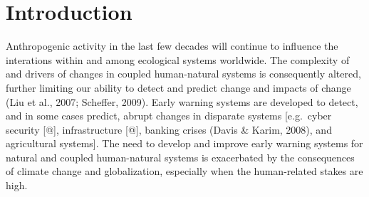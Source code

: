 \documentclass[12pt,twoside,openany]{reedthesis}
\begin{document}
\chapter{Introduction}\label{intro-chapter}

Anthropogenic activity in the last few decades will continue to
influence the interations within and among ecological systems worldwide.
The complexity of and drivers of changes in coupled human-natural
systems is consequently altered, further limiting our ability to detect
and predict change and impacts of change (Liu et al., 2007; Scheffer,
2009). Early warning systems are developed to detect, and in some cases
predict, abrupt changes in disparate systems {[}e.g.~cyber security
{[}@{]}, infrastructure {[}@{]}, banking crises (Davis \& Karim, 2008),
and agricultural systems{]}. The need to develop and improve early
warning systems for natural and coupled human-natural systems is
exacerbated by the consequences of climate change and globalization,
especially when the human-related stakes are high.
\end{document}
